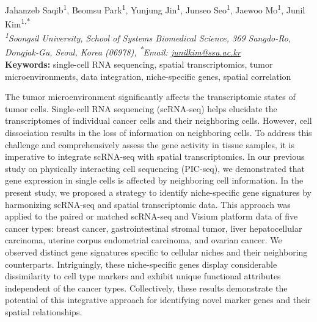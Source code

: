 \begin{center}
Jahanzeb Saqib\textsuperscript{1}, Beomsu Park\textsuperscript{1}, Yunjung Jin\textsuperscript{1}, Junseo Seo\textsuperscript{1}, Jaewoo Mo\textsuperscript{1}, Junil Kim\textsuperscript{1,*} \\
\vspace{0.2cm}
\textit{\textsuperscript{1}Soongsil University, School of Systems Biomedical Science, 369 Sangdo-Ro, Dongjak-Gu, Seoul, Korea (06978), \textsuperscript{*}Email: \href{mailto:junilkim@ssu.ac.kr}{junilkim@ssu.ac.kr}} \\
\vspace{0.2cm}
\textbf{Keywords:} single-cell RNA sequencing, spatial transcriptomics, tumor microenvironments, data integration, niche-specific genes, spatial correlation
\end{center}

\noindent
The tumor microenvironment significantly affects the transcriptomic states of tumor cells. Single-cell RNA sequencing (scRNA-seq) helps elucidate the transcriptomes of individual cancer cells and their neighboring cells. However, cell dissociation results in the loss of information on neighboring cells. To address this challenge and comprehensively assess the gene activity in tissue samples, it is imperative to integrate scRNA-seq with spatial transcriptomics. In our previous study on physically interacting cell sequencing (PIC-seq), we demonstrated that gene expression in single cells is affected by neighboring cell information. In the present study, we proposed a strategy to identify niche-specific gene signatures by harmonizing scRNA-seq and spatial transcriptomic data. This approach was applied to the paired or matched scRNA-seq and Visium platform data of five cancer types: breast cancer, gastrointestinal stromal tumor, liver hepatocellular carcinoma, uterine corpus endometrial carcinoma, and ovarian cancer. We observed distinct gene signatures specific to cellular niches and their neighboring counterparts. Intriguingly, these niche-specific genes display considerable dissimilarity to cell type markers and exhibit unique functional attributes independent of the cancer types. Collectively, these results demonstrate the potential of this integrative approach for identifying novel marker genes and their spatial relationships.
\newpage

